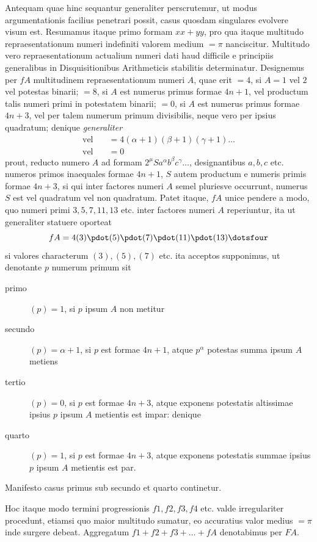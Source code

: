 Antequam quae hinc sequantur generaliter perscrutemur, ut modus argumentationis facilius penetrari possit, casus quosdam singulares evolvere visum est. Resumamus itaque primo formam $xx+yy$, pro qua itaque multitudo repraesentationum numeri indefiniti valorem medium $=\pi$ nanciscitur. Multitudo vero repraesentationum actualium numeri dati haud difficile e principiis generalibus in Disquisitionibus Arithmeticis stabilitis determinatur. Designemus per $fA$ multitudinem repraesentationum numeri $A$, quae erit $=4$, si $A=1$ vel $2$ vel potestas binarii; $=8$, si $A$ est numerus primus formae $4n+1$, vel productum
talis numeri primi in potestatem binarii; $=0$, si $A$ est numerus primus formae $4n+3$, vel per talem numerum primum divisibilis, neque vero per ipsius quadratum; denique \emph{generaliter}
\[
\begin{aligned}
\text{vel}\quad&=4(\alpha+1)(\beta+1)(\gamma+1)\ldots\\
\text{vel}\quad&=0
\end{aligned}
\]
prout, reducto numero $A$ ad formam $2^\mu Sa^\alpha b^\beta c^\gamma\ldots$, designantibus $a,b,c$ etc. numeros primos inaequales formae $4n+1$, $S$ autem productum e numeris primis formae $4n+3$, si qui inter factores numeri $A$ semel pluriesve occurrunt, numerus $S$ est vel quadratum vel non quadratum. Patet itaque, $fA$ unice pendere a modo, quo numeri primi $3,5,7,11,13$ etc. inter factores numeri $A$ reperiuntur, ita ut generaliter statuere oporteat
\[
fA=4(3)\pdot(5)\pdot(7)\pdot(11)\pdot(13)\dotsfour
\]
si valores characterum $(3),(5),(7)$ etc. ita acceptos supponimus, ut denotante $p$ numerum primum sit

\begin{description}
\item[primo] $(p)=1$, si $p$ ipsum $A$ non metitur
\item[secundo] $(p)=\alpha+1$, si $p$ est formae $4n+1$, atque $p^\alpha$ potestas summa ipsum $A$ metiens
\item[tertio] $(p)=0$, si $p$ est formae $4n+3$, atque exponens potestatis altissimae ipsius $p$ ipsum $A$ metientis est impar: denique
\item[quarto] $(p)=1$, si $p$ est formae $4n+3$, atque exponens potestatis summae ipsius $p$ ipsum $A$ metientis est par.
\end{description}
Manifesto casus primus sub secundo et quarto continetur.

Hoc itaque modo termini progressionis $f1,f2,f3,f4$ etc. valde irregulariter procedunt, etiamsi quo maior multitudo sumatur, eo accuratius valor medius $=\pi$ inde surgere debeat. Aggregatum $f1+f2+f3+\ldots+fA$ denotabimus per $FA$.

